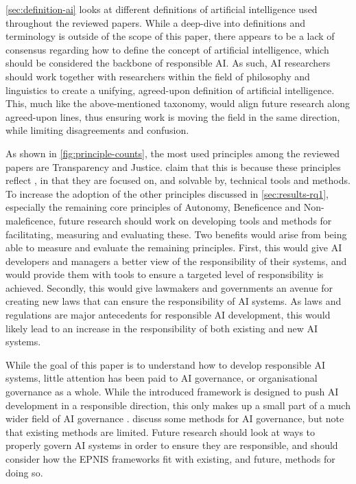 \autoref{sec:definition-ai} looks at different definitions of artificial intelligence used throughout the reviewed papers. While a deep-dive into definitions and terminology is outside of the scope of this paper, there appears to be a lack of consensus regarding how to define the concept of artificial intelligence, which should be considered the backbone of responsible AI. As such, AI researchers should work together with researchers within the field of philosophy and linguistics to create a unifying, agreed-upon definition of artificial intelligence. This, much like the above-mentioned taxonomy, would align future research along agreed-upon lines, thus ensuring work is moving the field in the same direction, while limiting disagreements and confusion.


As shown in \autoref{fig:principle-counts}, the most used principles among the reviewed papers are Transparency and Justice. \textcite[p.~103]{Hagendorff_2020} claim that this is because these principles reflect , in that they are focused on, and solvable by, technical tools and methods. To increase the adoption of the other principles discussed in \autoref{sec:results-rq1}, especially the remaining core principles of Autonomy, Beneficence and Non-maleficence, future research should work on developing tools and methods for facilitating, measuring and evaluating these. Two benefits would arise from being able to measure and evaluate the remaining principles. First, this would give AI developers and managers a better view of the responsibility of their systems, and would provide them with tools to ensure a targeted level of responsibility is achieved. Secondly, this would give lawmakers and governments an avenue for creating new laws that can ensure the responsibility of AI systems. As laws and regulations are major antecedents for responsible AI development, this would likely lead to an increase in the responsibility of both existing and new AI systems.


While the goal of this paper is to understand how to develop responsible AI systems, little attention has been paid to AI governance, or organisational governance as a whole. While the introduced framework is designed to push AI development in a responsible direction, this only makes up a small part of a much wider field of AI governance \parencite{Papagiannidis_2022_governance}. \textcite{Gianni_2022} discuss some methods for AI governance, but note that existing methods are limited. Future research should look at ways to properly govern AI systems in order to ensure they are responsible, and should consider how the EPNIS frameworks fit with existing, and future, methods for doing so.

